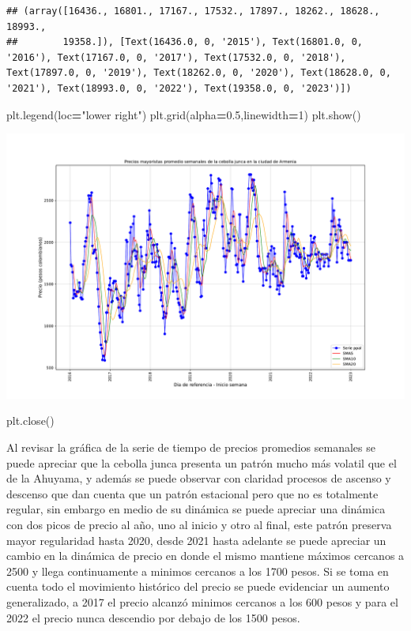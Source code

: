 \documentclass[
]{book}
\newenvironment{Shaded}{\begin{snugshade}}{\end{snugshade}}
\newcommand{\DecValTok}[1]{\textcolor[rgb]{0.00,0.00,0.81}{#1}}
\newcommand{\FloatTok}[1]{\textcolor[rgb]{0.00,0.00,0.81}{#1}}
\newcommand{\NormalTok}[1]{#1}
\newcommand{\OperatorTok}[1]{\textcolor[rgb]{0.81,0.36,0.00}{\textbf{#1}}}
\newcommand{\StringTok}[1]{\textcolor[rgb]{0.31,0.60,0.02}{#1}}
\begin{document}
\begin{verbatim}
## (array([16436., 16801., 17167., 17532., 17897., 18262., 18628., 18993.,
##        19358.]), [Text(16436.0, 0, '2015'), Text(16801.0, 0, '2016'), Text(17167.0, 0, '2017'), Text(17532.0, 0, '2018'), Text(17897.0, 0, '2019'), Text(18262.0, 0, '2020'), Text(18628.0, 0, '2021'), Text(18993.0, 0, '2022'), Text(19358.0, 0, '2023')])
\end{verbatim}

\begin{Shaded}
\begin{Highlighting}[]
\NormalTok{plt.legend(loc}\OperatorTok{=}\StringTok{"lower right"}\NormalTok{)}
\NormalTok{plt.grid(alpha}\OperatorTok{=}\FloatTok{0.5}\NormalTok{,linewidth}\OperatorTok{=}\DecValTok{1}\NormalTok{)}
\NormalTok{plt.show()}
\end{Highlighting}
\end{Shaded}

\includegraphics{bookdown-demo_files/figure-latex/unnamed-chunk-55-15.pdf}

\begin{Shaded}
\begin{Highlighting}[]
\NormalTok{plt.close()}
\end{Highlighting}
\end{Shaded}

Al revisar la gráfica de la serie de tiempo de precios promedios semanales se puede apreciar que la cebolla junca presenta un patrón mucho más volatil que el de la Ahuyama, y además se puede observar con claridad procesos de ascenso y descenso que dan cuenta que un patrón estacional pero que no es totalmente regular, sin embargo en medio de su dinámica se puede apreciar una dinámica con dos picos de precio al año, uno al inicio y otro al final, este patrón preserva mayor regularidad hasta 2020, desde 2021 hasta adelante se puede apreciar un cambio en la dinámica de precio en donde el mismo mantiene máximos cercanos a 2500 y llega continuamente a minimos cercanos a los 1700 pesos. Si se toma en cuenta todo el movimiento histórico del precio se puede evidenciar un aumento generalizado, a 2017 el precio alcanzó minimos cercanos a los 600 pesos y para el 2022 el precio nunca descendio por debajo de los 1500 pesos.
\end{document}
